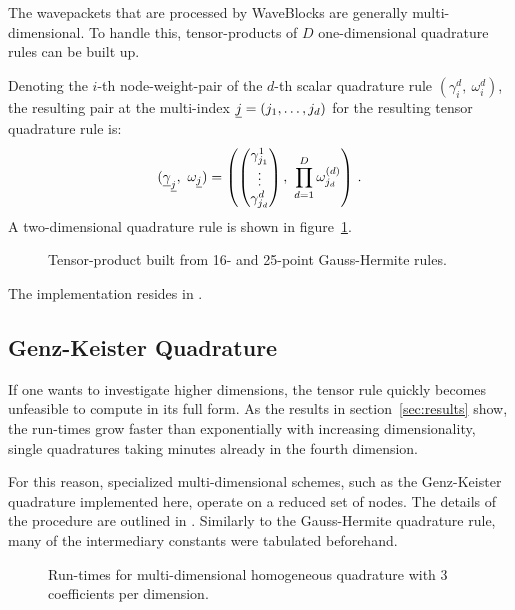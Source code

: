 The wavepackets that are processed by WaveBlocks are generally multi-dimensional.
To handle this, tensor-products of $D$ one-dimensional quadrature rules can be
built up.

Denoting the $i$-th node-weight-pair of the $d$-th scalar quadrature rule
$(\gamma_i^d,\ \omega_i^d)$, the resulting pair at the multi-index $\underline{j} =
(j_1, \ldots, j_d)$ for the resulting tensor quadrature rule is:
\begin{equation}
  (\vect{\gamma}_{\vect{j}},\ \omega_{\vect{j}}) = \left(
    \begin{pmatrix} \gamma_{j_1}^1 \\ \vdots \\ \gamma_{j_d}^d \end{pmatrix},
    \ \prod_{d=1}^D \omega_{j_d}^{(d)}
  \right) \,.
\end{equation}
A two-dimensional quadrature rule is shown in figure~\ref{fig:tpexample}.

\begin{figure}
  \center
  
  \caption{Tensor-product built from 16- and 25-point Gauss-Hermite rules.}
  \label{fig:tpexample}
\end{figure}

The implementation resides in .


\subsection{Genz-Keister Quadrature}
\label{subsec:gkquad}

If one wants to investigate higher dimensions, the tensor rule quickly becomes
unfeasible to compute in its full form.
As the results in section~\ref{sec:results} show, the run-times grow faster than
exponentially with increasing dimensionality, single quadratures taking minutes
already in the fourth dimension.

For this reason, specialized multi-dimensional schemes, such as the Genz-Keister
quadrature implemented here, operate on a reduced set of nodes.
The details of the procedure are outlined in \cite{B_kes}.
Similarly to the Gauss-Hermite quadrature rule, many of the intermediary
constants were tabulated beforehand.

\begin{figure}
  \center
  
  \caption{Run-times for multi-dimensional homogeneous quadrature with 3
    coefficients per dimension.}
  \label{fig:comparisonmultid}
\end{figure}

